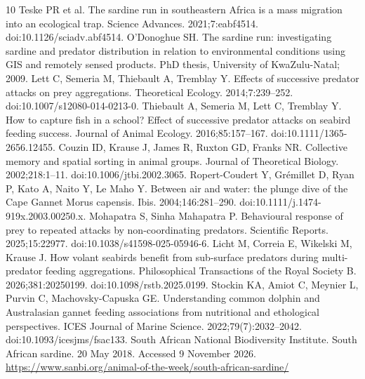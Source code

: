 \documentclass[10pt,a4paper,twocolumn]{article}
\begin{document}
\begin{thebibliography}{10}
 Teske PR et al. The sardine run in southeastern Africa is a mass migration into an ecological trap. Science Advances. 2021;7:eabf4514. doi:10.1126/sciadv.abf4514.
 O'Donoghue SH. The sardine run: investigating sardine and predator distribution in relation to environmental conditions using GIS and remotely sensed products. PhD thesis, University of KwaZulu-Natal; 2009.
 Lett C, Semeria M, Thiebault A, Tremblay Y. Effects of successive predator attacks on prey aggregations. Theoretical Ecology. 2014;7:239--252. doi:10.1007/s12080-014-0213-0.
 Thiebault A, Semeria M, Lett C, Tremblay Y. How to capture fish in a school? Effect of successive predator attacks on seabird feeding success. Journal of Animal Ecology. 2016;85:157--167. doi:10.1111/1365-2656.12455.
 Couzin ID, Krause J, James R, Ruxton GD, Franks NR. Collective memory and spatial sorting in animal groups. Journal of Theoretical Biology. 2002;218:1--11. doi:10.1006/jtbi.2002.3065.
 Ropert-Coudert Y, Grémillet D, Ryan P, Kato A, Naito Y, Le Maho Y. Between air and water: the plunge dive of the Cape Gannet Morus capensis. Ibis. 2004;146:281--290. doi:10.1111/j.1474-919x.2003.00250.x.
 Mohapatra S, Sinha Mahapatra P. Behavioural response of prey to repeated attacks by non-coordinating predators. Scientific Reports. 2025;15:22977. doi:10.1038/s41598-025-05946-6.
 Licht M, Correia E, Wikelski M, Krause J. How volant seabirds benefit from sub-surface predators during multi-predator feeding aggregations. Philosophical Transactions of the Royal Society B. 2026;381:20250199. doi:10.1098/rstb.2025.0199.
 Stockin KA, Amiot C, Meynier L, Purvin C, Machovsky-Capuska GE. Understanding common dolphin and Australasian gannet feeding associations from nutritional and ethological perspectives. ICES Journal of Marine Science. 2022;79(7):2032--2042. doi:10.1093/icesjms/fsac133.
 South African National Biodiversity Institute. South African sardine. 20 May 2018. Accessed 9 November 2026. \url{https://www.sanbi.org/animal-of-the-week/south-african-sardine/}
\end{thebibliography}
\end{document}
